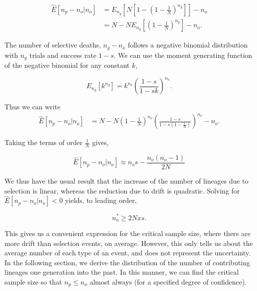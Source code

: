 \documentclass[review]{elsarticle}
\begin{document}
\begin{equation*}
  \begin{aligned}
    \label{eq:lineages-derive}
    \hat{E}[n_p -n_o | n_o]
    & =   E_{n_g}\left[N\left[1-\left(1 - \frac{1}{N} \right)^{n_g} \right]\right]- n_o\\
    & =   N-N  E_{n_g}\left[\left(1 - \frac{1}{N} \right)^{n_g} \right] -n_o. 
  \end{aligned}
\end{equation*}

The number of selective deaths, $n_g-n_o$ follows a negative binomial distribution with $n_g$ trials
and success rate $1-s$. We can use the moment generating function of the negative binomial for any
constant $k$,

\begin{equation}
E_{n_g}[k^{n_g}] = k^{n_o}  \left(\frac{1-s}{1-sk}\right)^{n_o}.
\label{eq:identity}
\end{equation} 

Thus we can write 
\begin{align}
  \label{eq:lineages-exact}
  \hat{E}[n_p -n_o | n_o] &= N-N\left( 1 - \frac{1}{N} \right)^{n_o}\left( \frac{1-s}{1-s \left( 1 - \frac{1}{N} \right)}\right)^{n_o}-n_o.
\end{align}

Taking the terms of order $\frac{1}{N}$ gives,

\begin{equation*}
    \label{eq:lineages-approx}
    \hat{E}[n_p-n_o | n_o] \approx n_os - \frac{n_o (n_o-1) }{2N}  
\end{equation*}

We thus have the usual result that the increase of the number of lineages due to selection is
linear, whereas the reduction due to drift is quadratic. Solving for $ \hat{E}[n_p -n_o | n_o]<0$
yields, to leading order,

\begin{equation}
  \label{eq:critical-sample}
  n_o^* \ge 2Nxs.
\end{equation}

This gives us a convenient expression for the critical sample size, where there are more drift than
selection events, on average. However, this only tells us about the average number of each type of
an event, and does not represent the uncertainty. In the following section, we derive the
distribution of the number of contributing lineages one generation into the past. In this manner, we
can find the critical sample size so that $n_p \leq n_o$ almost always (for a specified degree of
confidence).
\end{document}
